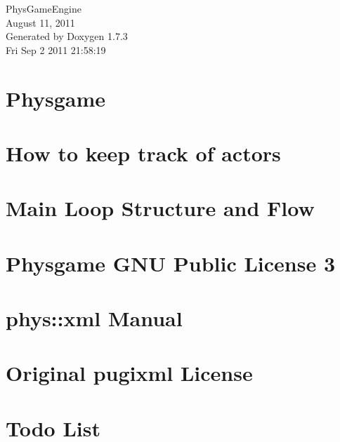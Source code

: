 \documentclass[a4paper]{article}
\begin{document}
\hypersetup{pageanchor=false}
\begin{titlepage}
\vspace*{7cm}
\begin{center}
{\Large PhysGameEngine \\[1ex]\large August 11, 2011 }\\
\vspace*{1cm}
{\large Generated by Doxygen 1.7.3}\\
\vspace*{0.5cm}
{\small Fri Sep 2 2011 21:58:19}\\
\end{center}
\end{titlepage}
\tableofcontents
{}
\hypersetup{pageanchor=true}
\section{Physgame}
\label{index}\hypertarget{index}{}
\section{How to keep track of actors}
\label{actorcontainer1}
\hypertarget{actorcontainer1}{}

\section{Main Loop Structure and Flow}
\label{mainloop1}
\hypertarget{mainloop1}{}

\section{Physgame GNU Public License 3}
\label{GPLLicense}
\hypertarget{GPLLicense}{}

\section{phys::xml Manual}
\label{XMLManual}
\hypertarget{XMLManual}{}

\section{Original pugixml License}
\label{OriginalpugixmlLicense}
\hypertarget{OriginalpugixmlLicense}{}

\section{Todo List}
\label{todo}
\hypertarget{todo}{}

\end{document}
